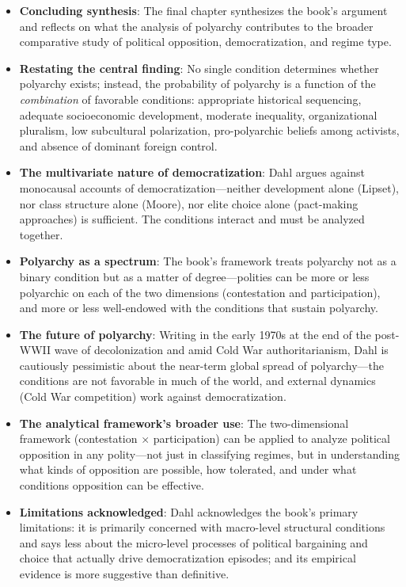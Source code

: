 \documentclass[12pt]{article}
\begin{document}
\begin{itemize}[leftmargin=*, itemsep=4pt]
    \item \textbf{Concluding synthesis}: The final chapter synthesizes the book's argument and reflects on what the analysis of polyarchy contributes to the broader comparative study of political opposition, democratization, and regime type.
    \item \textbf{Restating the central finding}: No single condition determines whether polyarchy exists; instead, the probability of polyarchy is a function of the \emph{combination} of favorable conditions: appropriate historical sequencing, adequate socioeconomic development, moderate inequality, organizational pluralism, low subcultural polarization, pro-polyarchic beliefs among activists, and absence of dominant foreign control.
    \item \textbf{The multivariate nature of democratization}: Dahl argues against monocausal accounts of democratization---neither development alone (Lipset), nor class structure alone (Moore), nor elite choice alone (pact-making approaches) is sufficient. The conditions interact and must be analyzed together.
    \item \textbf{Polyarchy as a spectrum}: The book's framework treats polyarchy not as a binary condition but as a matter of degree---polities can be more or less polyarchic on each of the two dimensions (contestation and participation), and more or less well-endowed with the conditions that sustain polyarchy.
    \item \textbf{The future of polyarchy}: Writing in the early 1970s at the end of the post-WWII wave of decolonization and amid Cold War authoritarianism, Dahl is cautiously pessimistic about the near-term global spread of polyarchy---the conditions are not favorable in much of the world, and external dynamics (Cold War competition) work against democratization.
    \item \textbf{The analytical framework's broader use}: The two-dimensional framework (contestation $\times$ participation) can be applied to analyze political opposition in any polity---not just in classifying regimes, but in understanding what kinds of opposition are possible, how tolerated, and under what conditions opposition can be effective.
    \item \textbf{Limitations acknowledged}: Dahl acknowledges the book's primary limitations: it is primarily concerned with macro-level structural conditions and says less about the micro-level processes of political bargaining and choice that actually drive democratization episodes; and its empirical evidence is more suggestive than definitive.

\end{itemize}
\end{document}
